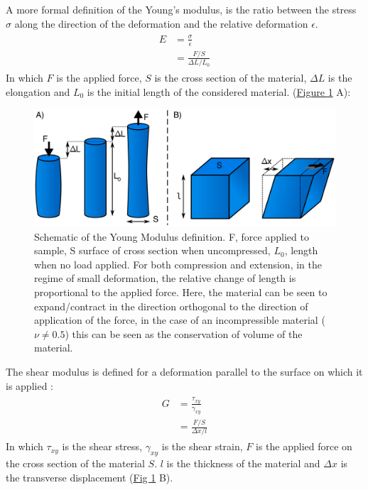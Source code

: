 \documentclass[A4paperpaper,11pt,english]{sphinxmanual}
\begin{document}
A  more formal definition of the Young's modulus, is the ratio between
the stress \(\sigma\) along the direction of the deformation and the relative deformation \(\epsilon\).
\label{index-latex:equation-eqa8}\begin{gather}
\begin{split}E &= \frac{\sigma}{\epsilon} \\
  & = \frac{   F/S }{   \Delta L / L_0        }\end{split}\label{index-latex-eqa8}
\end{gather}
In which \(F\) is the applied force, \(S\) is the cross section of the
material, \(\Delta L\) is the elongation and \(L_0\) is the initial
length of the considered material.  (\hyperref[index-latex:fym]{Figure  \ref*{index-latex:fym}} A):
\begin{figure}[htbp]
\centering
\capstart

\includegraphics[width=0.800\linewidth]{youngm.png}
\caption{Schematic of the Young Modulus definition. F, force applied to sample, S
surface of cross section when uncompressed, \(L_0\), length when no load
applied. For both compression and extension, in the regime of small
deformation, the relative change of length is proportional to the applied
force. Here, the material can be seen to expand/contract in the direction
orthogonal to the direction of application of the force, in the case of an
incompressible material (\(\nu \neq 0.5\)) this can be seen as the
conservation of volume of the material.}\label{index-latex:fym}\end{figure}

The shear modulus is defined for a deformation parallel to the surface on which it is applied :
\label{index-latex:equation-eqa9}\begin{gather}
\begin{split}G &= \frac{\tau_{xy}}{\gamma_{xy}} \\
  & = \frac{   F/S }{   \Delta x / l        }\end{split}\label{index-latex-eqa9}
\end{gather}
In which \(\tau_{xy}\) is the shear stress, \(\gamma_{xy}\) is the shear strain, \(F\) is the applied force
on the cross section of the material \(S\). \(l\) is the thickness of the material and \(\Delta x\) is the
transverse displacement (\hyperref[index-latex:fym]{Fig  \ref*{index-latex:fym}} B).
\end{document}
